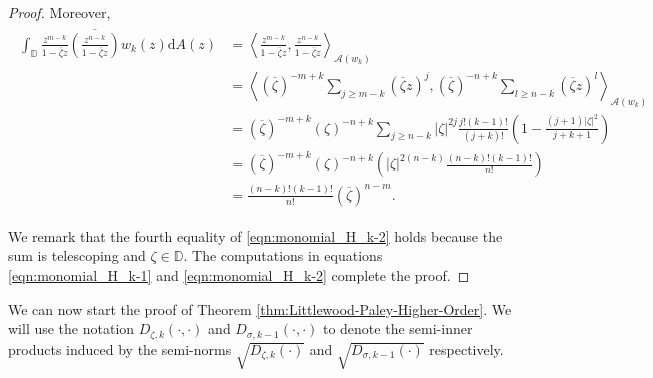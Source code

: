 \documentclass[10pt,oneside,reqno]{amsart}
\theoremstyle{definition}
\theoremstyle{remark}
\newcommand{\calA}{{\mathcal{A}}}
\newcommand{\ip}[1]{\left\langle #1 \right\rangle}
\newcommand{\abs}[1]{\left\lvert #1 \right\rvert}
\renewcommand{\ge}{\geqslant}
\newcommand{\D}{\mathbb D}
\numberwithin{equation}{section}
\begin{document}
\begin{proof}
    Moreover,
    \begin{align}
        \begin{split}
            \int_{\D} \frac{z^{m-k}}{1-\overline{\zeta} z} \overline{\left(  \frac{z^{n-k}}{1-\overline{\zeta} z} \right)} w_{k} \left( z \right) \mathrm{d}A \left( z \right) 
            &= \ip{\frac{z^{m-k}}{1 -\overline{\zeta} z},\frac{z^{n-k}}{1-\overline{\zeta} z}}_{\calA (w_k)} \\
            &= \ip{ (\overline{\zeta})^{-m+k} \sum_{j \ge m-k} \left( \overline{\zeta}z \right)^j , (\overline{\zeta})^{-n+k} \sum_{l \ge n-k} \left( \overline{\zeta}z \right)^l }_{\calA (w_k)} \\
            &= (\overline{\zeta})^{-m+k} (\zeta)^{-n+k} \sum_{j \ge n-k} \abs{\zeta}^{2j} \frac{j! (k-1)!}{(j+k)!} \left( 1- \frac{\left( j+1 \right) \abs{\zeta}^{2}}{j+k+1} \right) \\
            &=  (\overline{\zeta})^{-m+k} (\zeta)^{-n+k} \left( \abs{\zeta}^{2(n-k)} \frac{(n-k)! (k-1)!}{n!} \right) \\
            &=  \frac{(n-k)! (k-1)!}{n!} (\overline{\zeta})^{n-m}.
        \end{split}
        \label{eqn:monomial_H_k-2}
    \end{align}

    We remark that the fourth equality of \eqref{eqn:monomial_H_k-2} holds because the sum is telescoping and $\zeta \in \D$. The computations in equations \eqref{eqn:monomial_H_k-1} and \eqref{eqn:monomial_H_k-2} complete the proof.
\end{proof}

We can now start the proof of Theorem \ref{thm:Littlewood-Paley-Higher-Order}.  We will use the notation $D _{\zeta, k } \left( \cdot, \cdot \right) $ and $D _{\sigma, k-1 } \left( \cdot, \cdot \right) $ to denote the semi-inner products induced by the semi-norms $\sqrt{D _{\zeta, k } \left( \cdot \right)}$ and  $\sqrt{D _{\sigma, k-1 } \left( \cdot \right)}$ respectively.
\end{document}
